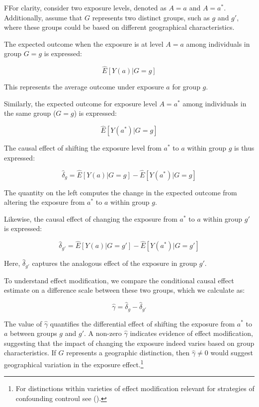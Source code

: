 \documentclass[
  singlecolumn,
  9pt]{article}
\begin{document}
FFor clarity, consider two exposure levels, denoted as \(A = a\) and
\(A = a^*\). Additionally, assume that \(G\) represents two distinct
groups, such as \(g\) and \(g'\), where these groups could be based on
different geographical characteristics.

The expected outcome when the exposure is at level \(A = a\) among
individuals in group \(G = g\) is expressed:

\[\hat{E}[Y(a)|G=g]\]

This represents the average outcome under exposure \(a\) for group
\(g\).

Similarly, the expected outcome for exposure level \(A = a^*\) among
individuals in the same group (\(G = g\)) is expressed:

\[\hat{E}[Y(a^*)|G=g]\]

The causal effect of shifting the exposure level from \(a^*\) to \(a\)
within group \(g\) is thus expressed:

\[\hat{\delta}_g = \hat{E}[Y(a)|G=g] - \hat{E}[Y(a^*)|G=g]\]

The quantity on the left computes the change in the expected outcome
from altering the exposure from \(a^*\) to \(a\) within group \(g\).

Likewise, the causal effect of changing the exposure from \(a^*\) to
\(a\) within group \(g'\) is expressed:

\[\hat{\delta}_{g'} = \hat{E}[Y(a)|G=g'] - \hat{E}[Y(a^*)|G=g']\]

Here, \(\hat{\delta}_{g'}\) captures the analogous effect of the
exposure in group \(g'\).

To understand effect modification, we compare the conditional causal
effect estimate on a difference scale between these two groups, which we
calculate as:

\[\hat{\gamma} = \hat{\delta}_g - \hat{\delta}_{g'}\]

The value of \(\hat{\gamma}\) quantifies the differential effect of
shifting the exposure from \(a^*\) to \(a\) between groups \(g\) and
\(g'\). A non-zero \(\hat{\gamma}\) indicates evidence of effect
modification, suggesting that the impact of changing the exposure indeed
varies based on group characteristics. If \(G\) represents a geographic
distinction, then \(\hat{\gamma} \neq 0\) would suggest geographical
variation in the exposure effect.\footnote{For distinctions within
  varieties of effect modification relevant for strategies of
  confounding controul see ().}
\end{document}
